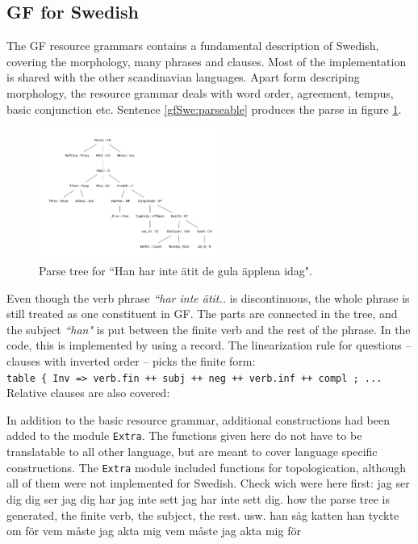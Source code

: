 \documentclass{report}
\begin{document}
\subsection{GF for Swedish}
The GF resource grammars contains a fundamental description of Swedish,
covering the morphology, many phrases and clauses. Most of the implementation
is shared with the other scandinavian languages.
Apart form descriping morphology, the resource grammar deals with
word order, agreement, tempus, basic conjunction etc.
Sentence \ref{gfSwe:parseable} produces the parse in figure \ref{gfSwe:parsetree}.
\label{gfSwe:parseable}
\begin{figure}[h]
\includegraphics[width=60mm]{gfTree.pdf}
\caption{Parse tree for ``Han har inte ätit de gula äpplena idag".}%
\label{gfSwe:parsetree}
\end{figure}
Even though the verb phrase \emph{``har inte ätit..} is discontinuous, the whole
phrase is still treated as one constituent in GF. The parts
are connected in the tree, and the subject \emph{``han"} is put between the
finite verb and the rest of the phrase. In the code, this is implemented by using a record.
The linearization rule for questions -- clauses with inverted order -- picks the 
finite form: \\
\verb|table { Inv => verb.fin ++ subj ++ neg ++ verb.inf ++ compl ; ... | \\
Relative clauses are also covered: 

In addition to the basic resource grammar, additional constructions had been added
to the module \verb|Extra|. The functions given here do not have to be translatable
to all other language, but are meant to cover language specific constructions.
The \verb|Extra| module included functions for topologication, although all
of them were not implemented for Swedish.
Check wich were here first:
jag ser dig
dig ser jag
dig har jag inte sett
jag har inte sett dig.
how the parse tree is generated, the finite verb, the subject, the rest. usw.
han såg katten han tyckte om
för vem måste jag akta mig
vem måste jag akta mig för
\end{document}
